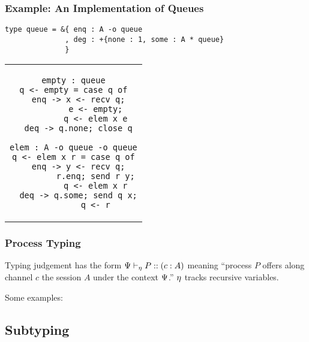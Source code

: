 \documentclass{beamer}
\begin{document}

\begin{frame}[fragile]
  \frametitle{Example: An Implementation of Queues}
  \begin{lstlisting}
type queue = &{ enq : A -o queue
              , deg : +{none : 1, some : A * queue}
              }
  \end{lstlisting}

  \begin{center}
  \begin{tabular}{c}
  \begin{lstlisting}
empty : queue
q <- empty = case q of
  enq -> x <- recv q;
         e <- empty;
         q <- elem x e
  deq -> q.none; close q

elem : A -o queue -o queue
q <- elem x r = case q of
  enq -> y <- recv q;
         r.enq; send r y;
         q <- elem x r
  deq -> q.some; send q x;
         q <- r
  \end{lstlisting}
  \end{tabular}
  \end{center}
\end{frame}


\begin{frame}[fragile]
  \frametitle{Process Typing}
  Typing judgement has the form ${\Psi} \vdash_{\eta} P :: (c : A)$ meaning ``process $P$ offers along channel $c$ the session $A$ under the context $\Psi$.'' $\eta$ tracks recursive variables.

  \pause
  \bigskip
  Some examples:

\end{frame}


\subsection{Subtyping}
\end{document}
